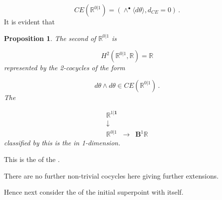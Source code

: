 \documentclass[12pt,titlepage]{article}
\newcommand{\itexarray}[1]{\begin{matrix}#1\end{matrix}}
\theoremstyle{plain}
\newtheorem{prop}{Proposition}
\theoremstyle{definition}
\theoremstyle{remark}
\begin{document}
\begin{displaymath}
CE(\mathbb{R}^{0\vert 1})
  =
  \left(
    \wedge^\bullet \langle d\theta \rangle, d_{CE} = 0
  \right)
  \,.
\end{displaymath}
It is evident that

\begin{prop}
\label{1dsuperMinkowskiFromInvariantExtension}\hypertarget{1dsuperMinkowskiFromInvariantExtension}{}
The second   of $\mathbb{R}^{0\vert 1}$ is

\begin{displaymath}
H^{2}(\mathbb{R}^{0\vert 1}, \mathbb{R})
  =
  \mathbb{R}
\end{displaymath}
represented by the 2-cocycles of the form

\begin{displaymath}
d\theta\wedge d\theta
  \in CE(\mathbb{R}^{0\vert 1})
  \,.
\end{displaymath}
The 

\begin{displaymath}
\itexarray{
    \mathbb{R}^{1|\mathbf{1}}
    \\
    \downarrow
    \\
    \mathbb{R}^{0|1}
    &\stackrel{}{\longrightarrow}&
    \mathbf{B}^1 \mathbb{R}
  }
\end{displaymath}
classified by this is the  in 1-dimension.

\end{prop}
This is the  of the .

There are no further non-trivial cocycles here giving further extensions.

Hence next consider the  of the initial superpoint with itself.
\end{document}
